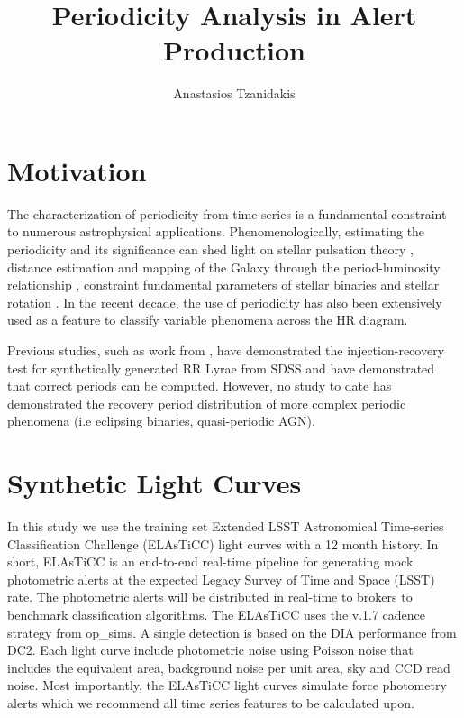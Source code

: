 \documentclass[DM,authoryear,toc]{lsstdoc}
\title{Periodicity Analysis in Alert Production}
\author{%
Anastasios Tzanidakis
}
\date{\vcsDate}
\begin{document}
\maketitle


\section{Motivation}
The characterization of periodicity from time-series is a fundamental constraint to numerous astrophysical applications. Phenomenologically, estimating the periodicity and its significance can shed light on stellar pulsation theory \citep{Antonello:Antonello81}, distance estimation and mapping of the Galaxy through the period-luminosity relationship \citep{Skowron:Skowron2019}, constraint fundamental parameters of stellar binaries \citep{Farinella:Farinella1979} and stellar rotation \citep{Walkowicz:Walkowicz13}. In the recent decade, the use of periodicity has also been extensively used as a feature to classify variable phenomena \citep{Richards:R13} across the HR diagram. 


 Previous studies, such as work from \citep{Oluseyi:Oluseyi2012}, have demonstrated the injection-recovery test for synthetically generated RR Lyrae from SDSS and have demonstrated that correct periods can be computed. However, no study to date has demonstrated the recovery period distribution of more complex periodic phenomena (i.e eclipsing binaries, quasi-periodic AGN).


\section{Synthetic Light Curves}
In this study we use the training set Extended LSST Astronomical Time-series Classification Challenge (ELAsTiCC) light curves with a 12 month history. In short, ELAsTiCC is an end-to-end real-time pipeline for generating mock photometric alerts at the expected Legacy Survey of Time and Space (LSST) rate. The photometric alerts will be distributed in real-time to brokers to benchmark classification algorithms. The ELAsTiCC uses the v.1.7 cadence strategy from op_sims. A single detection is based on the DIA performance from DC2. Each light curve include photometric noise using Poisson noise that includes the equivalent area, background noise per unit area, sky and CCD read noise. Most importantly, the ELAsTiCC light curves simulate force photometry alerts which we recommend all time series features to be calculated upon. 
\end{document}
